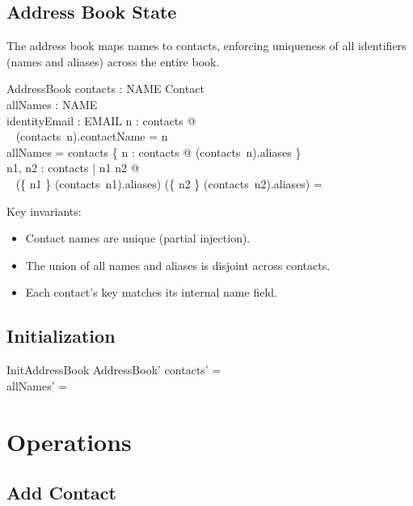 \documentclass[a4paper,10pt,fleqn]{article}
\begin{document}
\subsection{Address Book State}

The address book maps names to contacts, enforcing uniqueness of all
identifiers (names and aliases) across the entire book.

\begin{schema}{AddressBook}
contacts : NAME \pinj Contact \\
allNames : \power NAME \\
identityEmail : EMAIL
\where
\forall n : \dom contacts @ \\
\quad~ (contacts~n).contactName = n \\
allNames = \dom contacts \cup
  \bigcup \{ n : \dom contacts @ (contacts~n).aliases \} \\
\forall n1, n2 : \dom contacts | n1 \neq n2 @ \\
\quad~ (\{ n1 \} \cup (contacts~n1).aliases) \cap
  (\{ n2 \} \cup (contacts~n2).aliases) = \emptyset
\end{schema}

Key invariants:
\begin{itemize}
\item Contact names are unique (partial injection).
\item The union of all names and aliases is disjoint across contacts.
\item Each contact's key matches its internal name field.
\end{itemize}

\subsection{Initialization}

\begin{schema}{InitAddressBook}
AddressBook'
\where
contacts' = \emptyset \\
allNames' = \emptyset
\end{schema}

\section{Operations}

\subsection{Add Contact}
\end{document}
